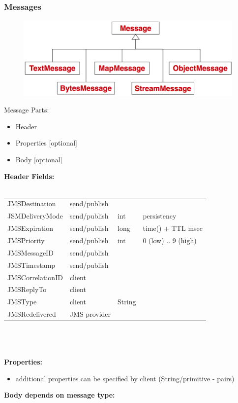 \documentclass[10pt]{article}
\begin{document}
\subsubsection{Messages}
\begin{figure}
	\centering
	\includegraphics[scale=0.2]{jms-api-message.png}%
\end{figure}
Message Parts:
\begin{itemize}
	\item Header
	\item Properties [optional]
	\item Body [optional]
\end{itemize}
\textbf{Header Fields:} \\ \\
\begin{tabular}{l l l l}
	JMSDestination & send/publish \\
	JSMDeliveryMode & send/publish & int & persistency \\
	JMSExpiration & send/publish & long & time() + TTL msec \\
	JMSPriority & send/publish & int & 0 (low) .. 9 (high) \\
	JMSMessageID & send/publish \\
	JMSTimestamp & send/publish \\
	JMSCorrelationID & client \\
	JMSReplyTo & client \\
	JMSType	 & client & String \\
	JMSRedelivered & JMS provider \\
\end{tabular} \\ \\ \\
\textbf{Properties: }
\begin{itemize}
	\item additional properties can be specified by client (String/primitive - pairs)
\end{itemize}
\textbf{Body depends on message type:}
\end{document}
